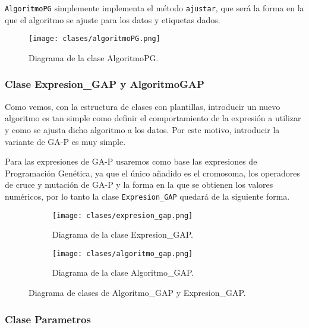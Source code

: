 \texttt{AlgoritmoPG} simplemente implementa el método \texttt{ajustar}, que será la forma en la que el algoritmo se ajuste para los datos y etiquetas dados.


\begin{figure}[H]
	 \centering
	 \texttt{[image: clases/algoritmoPG.png]}
	 \caption{Diagrama de la clase AlgoritmoPG.}
	\label{fig:diagrama_clase_algoritmoPG}
\end{figure}

\newpage

\subsubsection{Clase Expresion\_GAP y AlgoritmoGAP}

Como vemos, con la estructura de clases con plantillas, introducir un nuevo algoritmo es tan simple como definir el comportamiento de la expresión a utilizar y como se ajusta dicho algoritmo a los datos. Por este motivo, introducir la variante de GA-P es muy simple.

Para las expresiones de GA-P usaremos como base las expresiones de Programación Genética, ya que el único añadido es el cromosoma, los operadores de cruce y mutación de GA-P y la forma en la que se obtienen los valores numéricos, por lo tanto la clase \texttt{Expresion\_GAP} quedará de la siguiente forma.



\begin{figure}[H]
    \centering
	 \begin{subfigure}[b]{0.49\textwidth}
		 \centering
		 \texttt{[image: clases/expresion\_gap.png]}
		 \caption{Diagrama de la clase Expresion\_GAP.}
		\label{fig:diagrama_clase_expresion_gap}
	 \end{subfigure}
	\begin{subfigure}[b]{0.49\textwidth}
		 \centering
		 \texttt{[image: clases/algoritmo\_gap.png]}
 		\caption{Diagrama de la clase Algoritmo\_GAP.}
 	  \label{fig:diagrama_clase_algoritmo_gap}
   \end{subfigure}

	\caption{Diagrama de clases de Algoritmo\_GAP y Expresion\_GAP.}
	\label{fig:diagrama_clases_gap}
\end{figure}


\subsubsection{Clase Parametros}

